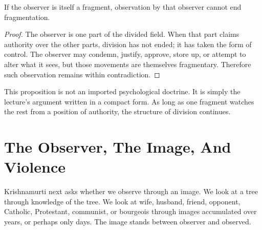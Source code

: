 \begin{figure}
\centering
{}
\end{figure}

\begin{proposition}
If the observer is itself a fragment, observation by that observer cannot end fragmentation.
\end{proposition}

\begin{proof}
The observer is one part of the divided field. When that part claims authority over the other parts, division has not ended; it has taken the form of control. The observer may condemn, justify, approve, store up, or attempt to alter what it sees, but those movements are themselves fragmentary. Therefore such observation remains within contradiction.
\end{proof}

This proposition is not an imported psychological doctrine. It is simply the lecture's argument written in a compact form. As long as one fragment watches the rest from a position of authority, the structure of division continues.

\section{The Observer, The Image, And Violence}

Krishnamurti next asks whether we observe through an image. We look at a tree through knowledge of the tree. We look at wife, husband, friend, opponent, Catholic, Protestant, communist, or bourgeois through images accumulated over years, or perhaps only days. The image stands between observer and observed.

